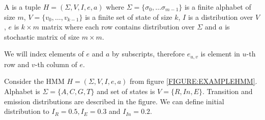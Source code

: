 \begin{definition}\label{DEF:HMM}
A  is a tuple $H=(\Sigma,V,I,e,a)$ where
$\Sigma=\{\sigma_0,\dots\sigma_{m-1}\}$ is a finite alphabet of size $m$,
$V=\{v_0,\dots,v_{k-1}\}$ is a finite set of state of size $k$, $I$ is
a distribution over $V$, $e$ is $k\times m$ matrix where each row contains
distribution over $\Sigma$ and $a$ is stochastic matrix of size $m\times m$.

We will index elements of $e$ and $a$ by subscripts, therefore $e_{u,v}$ is
element in $u$-th row and $v$-th column of $e$.  

\end{definition}

\begin{example}\label{EXAMPLE:EXAMPLEHMM} Consider the HMM $H=(\Sigma,V,I,e,a)$ from figure
\ref{FIGURE:EXAMPLEHMM}.  Alphabet is $\Sigma=\{A,C,G,T\}$ and set of states is
$V=\{R,In,E\}$.  Transition and emission distributions are described in the figure.
We can define initial distribution to $I_R=0.5, I_E=0.3$ and $I_{In}=0.2$.

\end{example}

